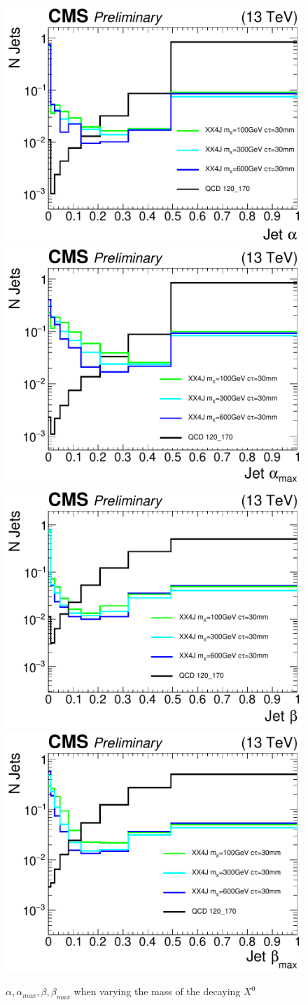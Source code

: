 \begin{figure}
\begin{center}
\includegraphics[width=.45\textwidth]{figures/an_jetid/VTX_MATCH_IP/XX4J_MASS_alpha}
\includegraphics[width=.45\textwidth]{figures/an_jetid/VTX_MATCH_IP/XX4J_MASS_alphaMax}
\includegraphics[width=.45\textwidth]{figures/an_jetid/VTX_MATCH_IP/XX4J_MASS_beta}
\includegraphics[width=.45\textwidth]{figures/an_jetid/VTX_MATCH_IP/XX4J_MASS_betaMax}
\end{center}
\caption{$\alpha, \alpha_{max}, \beta, \beta_{max}$ when varying the mass of the decaying $X^0$}
\label{fig:xx4j_mass_alpha_beta}
\end{figure}

